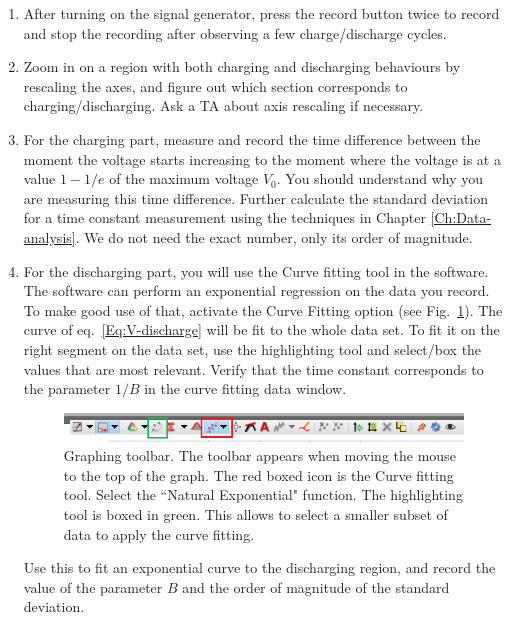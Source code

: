 \documentclass[12pt]{report}
\begin{document}
\begin{enumerate}
\item After turning on the signal generator, press the record button twice to record and stop the recording after observing a few charge/discharge cycles.

\item Zoom in on a region with both charging and discharging behaviours by rescaling the axes, and figure out which section corresponds to charging/discharging. Ask a TA about axis rescaling if necessary.

\item For the charging part, {\color{blue} measure and record the time difference between the moment the voltage starts increasing to the moment where the voltage is at a value $1-1/e$ of the maximum voltage $V_0$. 
You should understand why you are measuring this time difference.
Further calculate the standard deviation for a time constant measurement using the techniques in Chapter \ref{Ch:Data-analysis}. We do not need the exact number, only its order of magnitude.}

\item For the discharging part, you will use the Curve fitting tool in the software. The software can perform an exponential regression on the data you record. To make good use of that, activate the Curve Fitting option (see Fig.~\ref{Fig:lab2-interface-graph}). The curve of eq.~\eqref{Eq:V-discharge} will be fit to the whole data set. To fit it on the right segment on the data set, use the highlighting tool and select/box the values that are most relevant.  Verify that the time constant corresponds to the parameter $1/B$ in the curve fitting data window.
\begin{figure}[h]
\centering
\includegraphics[width=0.9 \linewidth]{lab2-interface-graph-tools}
\caption{Graphing toolbar. The toolbar appears when moving the mouse to the top of the graph. The red boxed icon is the Curve fitting tool. Select the ``Natural Exponential" function. 
The highlighting tool is boxed in green. This allows to select a smaller subset of data to apply the curve fitting.}
\label{Fig:lab2-interface-graph}
\end{figure}

Use this to fit an exponential curve to the discharging region, and {\color{blue} record the value of the parameter $B$ and the order of magnitude of the standard deviation}.


\end{enumerate}
\end{document}
